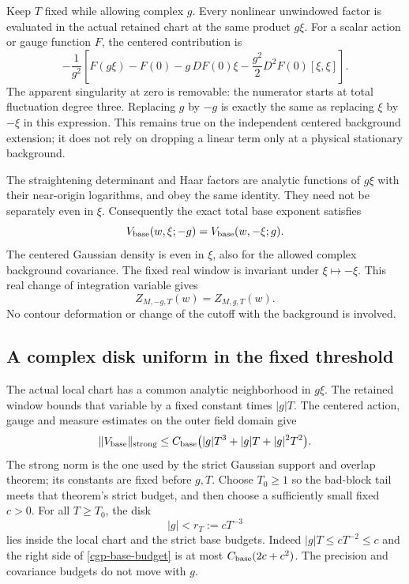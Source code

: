 \documentclass[11pt]{article}
\theoremstyle{remark}
\begin{document}
Keep $T$ fixed while allowing complex $g$. Every nonlinear
unwindowed factor is evaluated in the actual retained chart at the
same product $g\xi$. For a scalar action or gauge function $F$,
the centered contribution is
\begin{equation}
 -\frac1{g^2}\left[
 F(g\xi)-F(0)-g\,DF(0)\xi
                 -\frac{g^2}{2}D^2F(0)[\xi,\xi]\right].
 \label{cgp-centered-factor}
\end{equation}
The apparent singularity at zero is removable: the numerator
starts at total fluctuation degree three. Replacing $g$ by $-g$
is exactly the same as replacing $\xi$ by $-\xi$ in this
expression. This remains true on the independent centered
background extension; it does not rely on dropping a linear
term only at a physical stationary background.

The straightening determinant and Haar factors are analytic
functions of $g\xi$ with their near-origin logarithms, and obey
the same identity. They need not be separately even in $\xi$.
Consequently the exact total base exponent satisfies
\begin{equation}
             V_{\rm base}(w,\xi;-g)
                    =V_{\rm base}(w,-\xi;g).
 \label{cgp-base-parity}
\end{equation}
The centered Gaussian density is even in $\xi$, also for the
allowed complex background covariance. The fixed real window
is invariant under $\xi\mapsto-\xi$. This real change of
integration variable gives
\begin{equation}
                 Z_{M,-g,T}(w)=Z_{M,g,T}(w).
 \label{cgp-integral-parity}
\end{equation}
No contour deformation or change of the cutoff with the
background is involved.

\subsection{A complex disk uniform in the fixed threshold}
\label{cgp-disk-section}

The actual local chart has a common analytic neighborhood in
$g\xi$. The retained window bounds that variable by a fixed
constant times $|g|T$. The centered action, gauge and measure
estimates on the outer field domain give
\begin{equation}
 \|V_{\rm base}\|_{\rm strong}
   \le C_{\rm base}\bigl(|g|T^3+|g|T+|g|^2T^2\bigr).
 \label{cgp-base-budget}
\end{equation}
The strong norm is the one used by the strict Gaussian
support and overlap theorem; its constants are fixed before
$g,T$. Choose $T_0\ge1$ so the bad-block tail meets that
theorem's strict budget, and then choose a sufficiently
small fixed $c>0$. For all $T\ge T_0$, the disk
\begin{equation}
                         |g|<r_T:=cT^{-3}
 \label{cgp-disk}
\end{equation}
lies inside the local chart and the strict base budgets.
Indeed $|g|T\le cT^{-2}\le c$ and the right side of
\eqref{cgp-base-budget} is at most
$C_{\rm base}(2c+c^2)$. The precision and covariance
budgets do not move with $g$.
\end{document}
